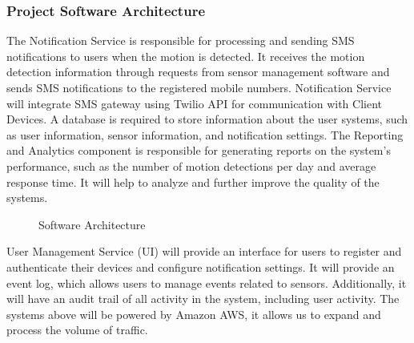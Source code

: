 \subsubsection{Project Software Architecture}

The Notification Service is responsible for processing and sending SMS notifications
to users when the motion is detected. %
It receives the motion detection information through requests from sensor management software and sends SMS notifications to the
registered mobile numbers. %
Notification Service will integrate SMS gateway using Twilio API for communication with Client Devices.
A database is required to store information about the user systems, such as user information, sensor information,
and notification settings. %
The Reporting and Analytics component is responsible for generating reports on the system’s performance, such as the number of motion
detections per day and average response time. %
It will help to analyze and further improve the quality of the systems. %


\begin{figure}
    \centering
    \caption{Software Architecture}
    \label{fig:softwareArchitecture}
\end{figure}



User Management Service (UI) will provide an interface for users to register and
authenticate their devices and configure notification settings. %
It will provide an event log, which allows users to manage events related to sensors. %
Additionally, it will have an audit trail of all activity in the system, including user activity. %
The systems above will be powered by Amazon AWS, it allows us to expand and process
the volume of traffic. %

